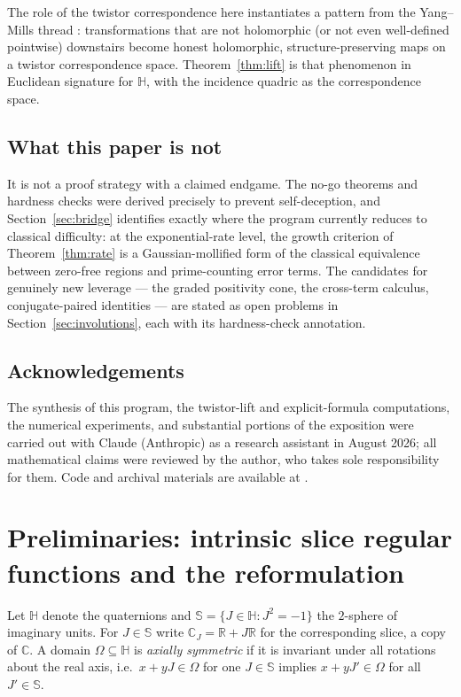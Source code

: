 \documentclass[11pt]{amsart}
\theoremstyle{plain}
\theoremstyle{definition}
\theoremstyle{remark}
\newcommand{\HH}{\mathbb{H}}
\newcommand{\CC}{\mathbb{C}}
\newcommand{\RR}{\mathbb{R}}
\renewcommand{\SS}{\mathbb{S}}
\begin{document}
The role of the twistor correspondence here instantiates a pattern from the Yang--Mills thread
\cite{Baker2022arXiv,Baker2023arXiv}: transformations that are not holomorphic (or not even
well-defined pointwise) downstairs become honest holomorphic, structure-preserving maps on a twistor
correspondence space. Theorem~\ref{thm:lift} is that phenomenon in Euclidean signature for $\HH$,
with the incidence quadric as the correspondence space.

\subsection*{What this paper is not}
It is not a proof strategy with a claimed endgame. The no-go theorems and hardness checks were
derived precisely to prevent self-deception, and Section~\ref{sec:bridge} identifies exactly where
the program currently reduces to classical difficulty: at the exponential-rate level, the growth
criterion of Theorem~\ref{thm:rate} is a Gaussian-mollified form of the classical equivalence
between zero-free regions and prime-counting error terms. The candidates for genuinely new leverage
--- the graded positivity cone, the cross-term calculus, conjugate-paired identities --- are stated
as open problems in Section~\ref{sec:involutions}, each with its hardness-check annotation.

\subsection*{Acknowledgements}
The synthesis of this program, the twistor-lift and explicit-formula computations, the numerical
experiments, and substantial portions of the exposition were carried out with Claude (Anthropic) as
a research assistant in August 2026; all mathematical claims were reviewed by the author, who takes
sole responsibility for them. Code and archival materials are available at \cite{ZenodoArchive}.

\section{Preliminaries: intrinsic slice regular functions and the reformulation}\label{sec:prelim}

Let $\HH$ denote the quaternions and $\SS=\{J\in\HH: J^2=-1\}$ the $2$-sphere of imaginary units.
For $J\in\SS$ write $\CC_J=\RR+J\RR$ for the corresponding slice, a copy of $\CC$. A domain
$\Omega\subseteq\HH$ is \emph{axially symmetric} if it is invariant under all rotations about the
real axis, i.e.\ $x+yJ\in\Omega$ for one $J\in\SS$ implies $x+yJ'\in\Omega$ for all $J'\in\SS$.
\end{document}
